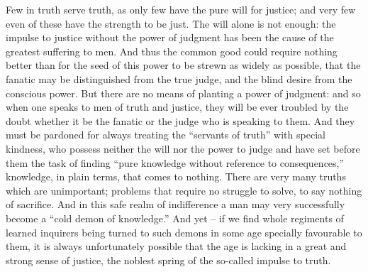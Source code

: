 Few in truth serve truth, as only few have the pure will for justice;
and very few even of these have the strength to be just. The will
alone is not enough: the impulse to justice without the power of
judgment has been the cause of the greatest suffering to men. And
thus the common good could require nothing better than for the seed
of this power to be strewn as widely as possible, that the fanatic
may be distinguished from the true judge, and the blind desire from
the conscious power. But there are no means of planting a power of
judgment: and so when one speaks to men of truth and justice, they
will be ever troubled by the doubt whether it be the fanatic or the
judge who is speaking to them. And they must be pardoned for always
treating the \enquote{servants of truth} with special kindness, who possess
neither the will nor the power to judge and have set before them the
task of finding \enquote{pure knowledge without reference to consequences,}
knowledge, in plain terms, that comes to nothing. There are very many
truths which are unimportant; problems that require no struggle to
solve, to say nothing of sacrifice. And in this safe realm of
indifference a man may very successfully become a \enquote{cold demon of
knowledge.} And yet -- if we find whole regiments of learned inquirers
being turned to such demons in some age specially favourable to them,
it is always unfortunately possible that the age is lacking in a
great and strong sense of justice, the noblest spring of the
so-called impulse to truth.

